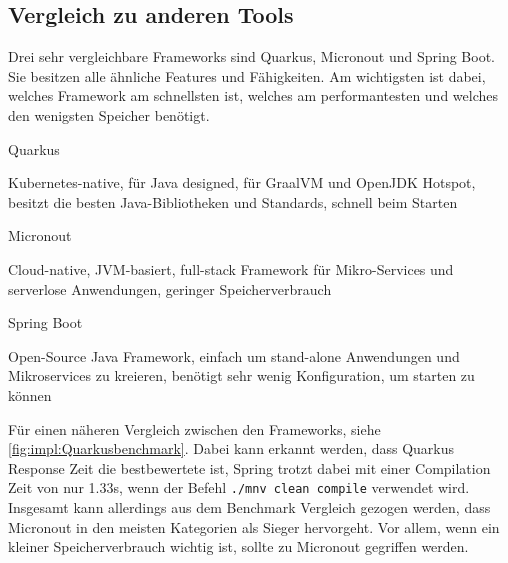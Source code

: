 \subsection{Vergleich zu anderen Tools}
Drei sehr vergleichbare Frameworks sind Quarkus, Micronout und Spring Boot. Sie besitzen alle ähnliche Features und Fähigkeiten.
Am wichtigsten ist dabei, welches Framework  am schnellsten ist, welches am performantesten und welches  den wenigsten Speicher benötigt.
\cite{Micr/QuarBenchmark}
 
\begin{compactitem}
    \item[Quarkus]
    \item Kubernetes-native, für Java designed, für GraalVM und OpenJDK Hotspot, besitzt die besten Java-Bibliotheken und Standards, schnell beim Starten
    \item[Micronout]
    \item Cloud-native, JVM-basiert, full-stack Framework für Mikro-Services und serverlose Anwendungen, geringer Speicherverbrauch
    \item[Spring Boot]
    \item Open-Source Java Framework, einfach um stand-alone Anwendungen und Mikroservices zu kreieren, benötigt sehr wenig Konfiguration, um starten zu können
\end{compactitem}
\cite{Micr/QuarBenchmark}
 
Für einen näheren Vergleich zwischen den Frameworks, siehe \ref{fig:impl:Quarkusbenchmark}. Dabei kann erkannt werden, dass Quarkus Response Zeit die bestbewertete ist, Spring trotzt dabei mit einer Compilation Zeit von nur 1.33s, wenn der Befehl \texttt{./mnv clean compile} verwendet wird. Insgesamt kann allerdings aus dem Benchmark Vergleich gezogen werden, dass Micronout in den meisten Kategorien als Sieger hervorgeht. Vor allem, wenn ein kleiner Speicherverbrauch wichtig ist, sollte zu Micronout gegriffen werden. \cite{MicrVSQuarVSSprin}
 
